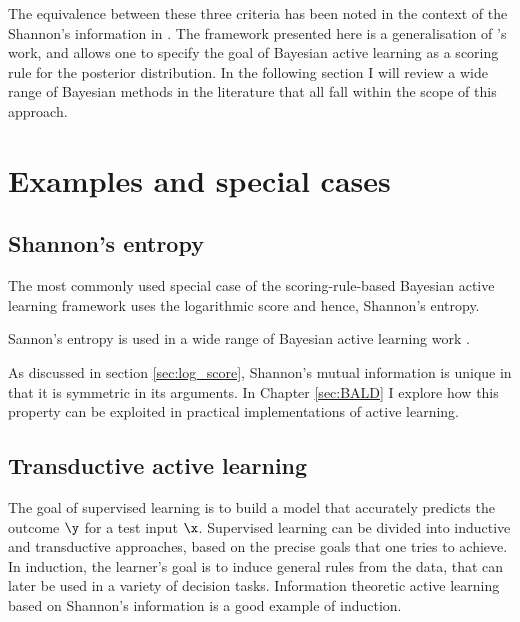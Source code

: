 The equivalence between these three criteria has been noted in the context of the Shannon's information in \citep{MacKay1992}. The framework presented here is a generalisation of \citeauthor{MacKay1992}'s work, and allows one to specify the goal of Bayesian active learning as a scoring rule for the posterior distribution. In the following section I will review a wide range of Bayesian methods in the literature that all fall within the scope of this approach.


\section{Examples and special cases}

\subsection{Shannon's entropy\label{sec:active_learning_shannon_information}}

The most commonly used special case of the scoring-rule-based Bayesian active learning framework uses the logarithmic score and hence, Shannon's entropy. 

Sannon's entropy is used in a wide range of Bayesian active learning work \citep{MacKay1992,Lawrence2004,Krause2006,Ji2008,Settles2010,Houlsby2011,Huszar2012quantum}.

As discussed in section \ref{sec:log_score}, Shannon's mutual information is unique in that it is symmetric in its arguments. In Chapter \ref{sec:BALD} I explore how this property can be exploited in practical implementations of active learning.

\subsection{Transductive active learning}

The goal of supervised learning is to build a model that accurately predicts the outcome $\y$ for a test input $\x$. Supervised learning can be divided into inductive and transductive approaches, based on the precise goals that one tries to achieve. In induction, the learner's goal is to induce general rules from the data, that can later be used in a variety of decision tasks. Information theoretic active learning based on Shannon's information is a good example of induction.

